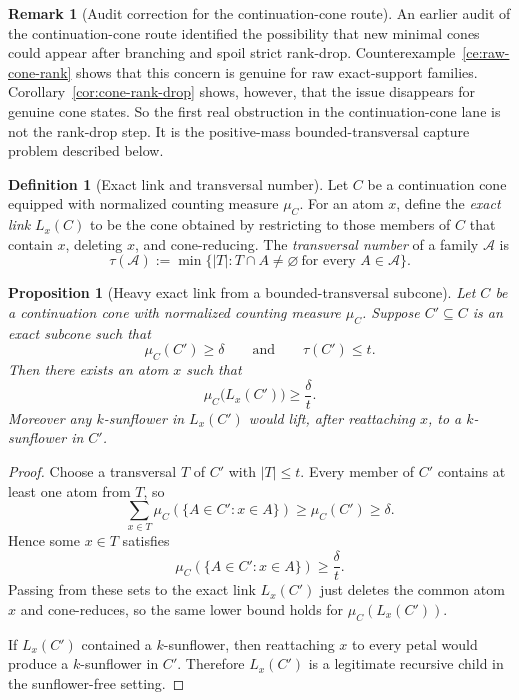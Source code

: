 \documentclass[11pt]{article}
\newtheorem{proposition}[theorem]{Proposition}
\theoremstyle{definition}
\newtheorem{definition}[theorem]{Definition}
\newtheorem{remark}[theorem]{Remark}
\newcommand{\1}{\mathbf{1}}
\begin{document}
\begin{remark}[Audit correction for the continuation-cone route]\label{rem:cone-route-audit}
An earlier audit of the continuation-cone route identified the possibility that new minimal cones could appear after branching and spoil strict rank-drop.
Counterexample~\ref{ce:raw-cone-rank} shows that this concern is genuine for raw exact-support families.
Corollary~\ref{cor:cone-rank-drop} shows, however, that the issue disappears for genuine cone states.
So the first real obstruction in the continuation-cone lane is not the rank-drop step.
It is the positive-mass bounded-transversal capture problem described below.
\end{remark}

\begin{definition}[Exact link and transversal number]\label{def:exact-link-transversal}
Let $C$ be a continuation cone equipped with normalized counting measure $\mu_C$.
For an atom $x$, define the \emph{exact link} $L_x(C)$ to be the cone obtained by restricting to those members of $C$ that contain $x$, deleting $x$, and cone-reducing.
The \emph{transversal number} of a family $\mathcal A$ is
\[
\tau(\mathcal A):=\min\{|T|:T\cap A\neq \varnothing\ \text{for every }A\in \mathcal A\}.
\]
\end{definition}

\begin{proposition}[Heavy exact link from a bounded-transversal subcone]\label{prop:heavy-exact-link}
Let $C$ be a continuation cone with normalized counting measure $\mu_C$.
Suppose $C'\subseteq C$ is an exact subcone such that
\[
\mu_C(C')\ge \delta
\qquad\text{and}\qquad
\tau(C')\le t.
\]
Then there exists an atom $x$ such that
\[
\mu_C\bigl(L_x(C')\bigr)\ge \frac{\delta}{t}.
\]
Moreover any $k$-sunflower in $L_x(C')$ would lift, after reattaching $x$, to a $k$-sunflower in $C'$.
\end{proposition}

\begin{proof}
Choose a transversal $T$ of $C'$ with $|T|\le t$.
Every member of $C'$ contains at least one atom from $T$, so
\[
\sum_{x\in T} \mu_C(\{A\in C':x\in A\})\ge \mu_C(C')\ge \delta.
\]
Hence some $x\in T$ satisfies
\[
\mu_C(\{A\in C':x\in A\})\ge \frac{\delta}{t}.
\]
Passing from these sets to the exact link $L_x(C')$ just deletes the common atom $x$ and cone-reduces, so the same lower bound holds for $\mu_C(L_x(C'))$.

If $L_x(C')$ contained a $k$-sunflower, then reattaching $x$ to every petal would produce a $k$-sunflower in $C'$.
Therefore $L_x(C')$ is a legitimate recursive child in the sunflower-free setting.
\end{proof}
\end{document}
